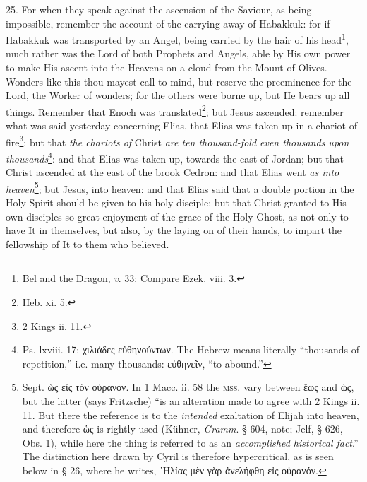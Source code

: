 25. For when they speak against the ascension of the Saviour, as being impossible, remember the account of the carrying away of Habakkuk: for if Habakkuk was transported by an Angel, being carried by the hair of his head\footnote{Bel and the Dragon, \emph{v}. 33: Compare Ezek. viii. 3.}, much rather was the Lord of both Prophets and Angels, able by His own power to make His ascent into the Heavens on a cloud from the Mount of Olives. Wonders like this thou mayest call to mind, but reserve the preeminence for the Lord, the Worker of wonders; for the others were borne up, but He bears up all things. Remember that Enoch was translated\footnote{Heb. xi. 5.}; but Jesus ascended: remember what was said yesterday concerning Elias, that Elias was taken up in a chariot of fire\footnote{2 Kings ii. 11.}; but that \emph{the chariots of} Christ \emph{are ten thousand-fold even thousands upon thousands}\footnote{Ps. lxviii. 17: \textgreek{χιλιάδες εὐθηνούντων}. The Hebrew means literally “thousands of repetition,” i.e. many thousands: \textgreek{εὐθηνεῖν}, “to abound.”}: and that Elias was taken up, towards the east of Jordan; but that Christ ascended at the east of the brook Cedron: and that Elias went \emph{as into heaven}\footnote{Sept. \textgreek{ὡς εἰς τὸν οὐρανόν}. In 1 Macc. ii. 58 the \textsc{mss.} vary between \textgreek{ἕως} and \textgreek{ὡς}, but the latter (says Fritzsche) “is an alteration made to agree with 2 Kings ii. 11. But there the reference is to the \emph{intended} exaltation of Elijah into heaven, and therefore \textgreek{ὡς} is rightly used (Kühner, \emph{Gramm}. § 604, note; Jelf, § 626, Obs. 1), while here the thing is referred to as an \emph{accomplished historical fact}.” The distinction here drawn by Cyril is therefore hypercritical, as is seen below in § 26, where he writes, \textgreek{᾽Ηλίας μὲν γὰρ ἀνελήφθη εἰς οὐρανόν}.}; but Jesus, into heaven: and that Elias said that a double portion in the Holy Spirit should be given to his holy disciple; but that Christ granted to His own disciples so great enjoyment of the grace of the Holy Ghost, as not only to have It in themselves, but also, by the laying on of their hands, to impart the fellowship of It to them who believed.

